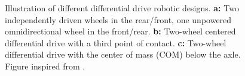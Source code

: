 \begin{figure}[htp]
  \centering
  
  \caption{Illustration of different differential drive robotic designs. \textbf{a:} Two independently driven wheels in the rear/front, one unpowered omnidirectional wheel in the front/rear. \textbf{b:} Two-wheel centered differential drive with a third point of contact. \textbf{c:} Two-wheel differential drive with the center of mass (COM) below the axle. Figure inspired from \cite{SiegwartRoland2011Itam}.}
  \label{fig:differentialDrive}
\end{figure}


%   




